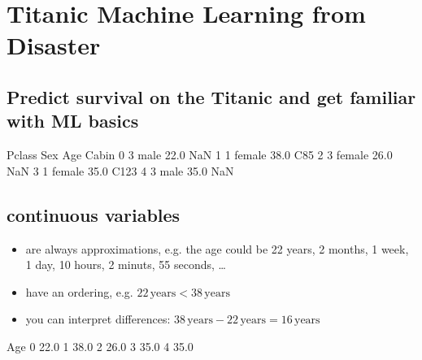 \documentclass[letterpaper,10pt,english]{jupyterBook}
\begin{document}
\chapter{Titanic \sphinxhyphen{} Machine Learning from Disaster}
\label{\detokenize{Data_Basics:titanic-machine-learning-from-disaster}}\label{\detokenize{Data_Basics::doc}}

\section{Predict survival on the Titanic and get familiar with ML basics}
\label{\detokenize{Data_Basics:predict-survival-on-the-titanic-and-get-familiar-with-ml-basics}}
\sphinxAtStartPar
{}

\begin{sphinxVerbatim}[commandchars=\\\{\}]
   Pclass     Sex   Age Cabin
0       3    male  22.0   NaN
1       1  female  38.0   C85
2       3  female  26.0   NaN
3       1  female  35.0  C123
4       3    male  35.0   NaN
\end{sphinxVerbatim}


\section{continuous variables}
\label{\detokenize{Data_Basics:continuous-variables}}\begin{itemize}
\item {} 
\sphinxAtStartPar
are always approximations, e.g. the age could be 22 years, 2 months, 1 week, 1 day, 10 hours, 2 minuts, 55 seconds, …

\item {} 
\sphinxAtStartPar
have an ordering, e.g. \(22\,\text{years} < 38\,\text{years}\)

\item {} 
\sphinxAtStartPar
you can interpret differences: \(38\,\text{years} - 22\,\text{years} = 16\,\text{years}\)

\end{itemize}

\begin{sphinxVerbatim}[commandchars=\\\{\}]
    Age
0  22.0
1  38.0
2  26.0
3  35.0
4  35.0
\end{sphinxVerbatim}
\end{document}

